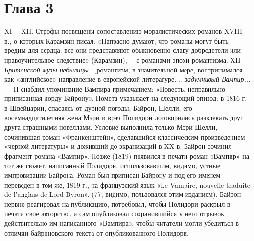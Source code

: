 \section{Глава 3}
XI —XII.
Строфы посвящены сопоставлению моралистических романов XVIII в., о которых Карамзин писал: «Напрасно думают, что романы могут быть вредны
для сердца: все они представляют обыкновенно славу добродетели или нравоучительное следствие» (Карамзин),— с романами эпохи романтизма.
XII
\emph{Британской музы небылицы...},романтизм, в значительной мере, воспринимался как «английское» направление в европейской литературе.
\emph{...задумчивый Вампир...} — П снабдил упоминание Вампира примечанием: «Повесть, неправильно приписанная лорду Байрону». Помета указывает на
следующий эпизод: в 1816 г. в Швейцарии, спасаясь от дурной погоды, Байрон, Шелли, его восемнадцатилетняя жена Мэри и врач Полидори договорились развлекать друг друга страшными новеллами. Условие выполнила только Мэри Шелли, сочинившая роман «Франкенштейн», сделавшийся классическим произведением «черной литературы» и доживший до экранизаций в XX в. Байрон сочинил фрагмент романа «Вампир». Позже (1819) появился в печати роман «Вампир» на тот же сюжет, написанный Полидори, использовавшим, видимо, устные импровизации Байрона. Роман был приписан Байрону и под его именем переведен в том же,
1819 г., на французский язык «Le Vampire, nouvelle traduite de l’anglais de Lord Byron». (77, видимо, пользовался этим изданием). Байрон нервно реагировал на
публикацию, потребовал, чтобы Полидори раскрыл в печати свое авторство, а сам опубликовал сохранившийся у него отрывок действительно им написанного «Вампира», чтобы читатели могли убедиться в отличии байроновского текста от опубликованного Полидори.
